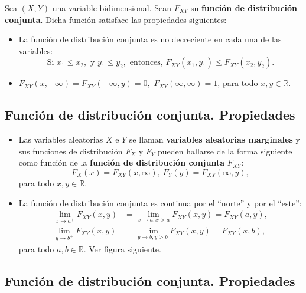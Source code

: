 \documentclass[]{book}
\begin{document}
Sea \((X,Y)\) una variable bidimensional. Sean \(F_{XY}\) su \textbf{función de distribución conjunta}. Dicha función satisface las propiedades siguientes:

\begin{itemize}
\item
  La función de distribución conjunta es no decreciente en cada una de las variables:
  \[
  \mbox{Si }x_1\leq x_2, \mbox{ y }y_1\leq y_2,\mbox{ entonces, }F_{XY}(x_1,y_1)\leq F_{XY}(x_2,y_2).
  \]
\item
  \(F_{XY}(x,-\infty)=F_{XY}(-\infty,y)=0,\) \(F_{XY}(\infty,\infty)=1\), para todo \(x,y\in\mathbb{R}\).
\end{itemize}

\hypertarget{funciuxf3n-de-distribuciuxf3n-conjunta.-propiedades-1}{%
\subsection{Función de distribución conjunta. Propiedades}\label{funciuxf3n-de-distribuciuxf3n-conjunta.-propiedades-1}}

\begin{itemize}
\item
  Las variables aleatorias \(X\) e \(Y\) se llaman \textbf{variables aleatorias marginales} y sus funciones de distribución \(F_X\) y \(F_Y\) pueden hallarse de la forma siguiente como función de la \textbf{función de distribución conjunta} \(F_{XY}\):
  \[
  F_X(x)=F_{XY}(x,\infty),\ F_Y(y)=F_{XY}(\infty,y),
  \]
  para todo \(x,y\in\mathbb{R}\).
\item
  La función de distribución conjunta es continua por el ``norte'' y por el ``este'':
  \[
  \begin{array}{rl}
  \lim_{x\to a^+}F_{XY}(x,y) & =\lim_{x\to a, x> a}F_{XY}(x,y)=F_{XY}(a,y), \\
  \lim_{y\to b^+}F_{XY}(x,y) & =\lim_{y\to b, y> b}F_{XY}(x,y)=F_{XY}(x,b),
  \end{array}
  \]
  para todo \(a,b\in\mathbb{R}\). Ver figura siguiente.
\end{itemize}

\hypertarget{funciuxf3n-de-distribuciuxf3n-conjunta.-propiedades-2}{%
\subsection{Función de distribución conjunta. Propiedades}\label{funciuxf3n-de-distribuciuxf3n-conjunta.-propiedades-2}}
\end{document}
